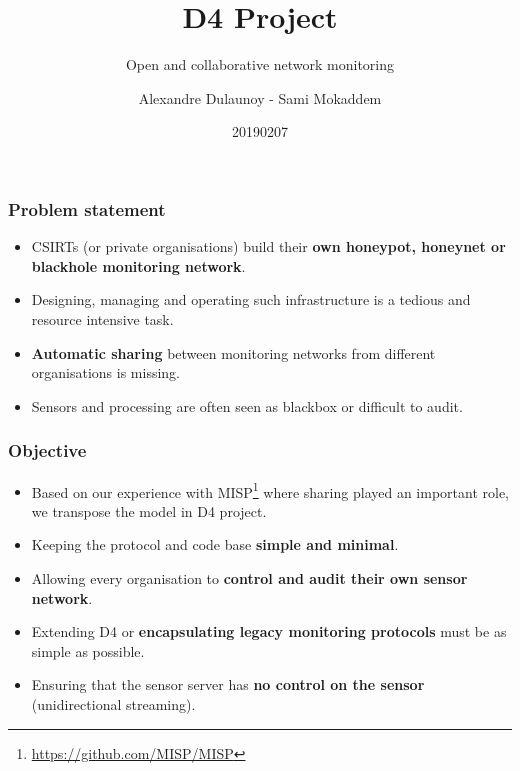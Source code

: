 \documentclass{beamer}
\title{D4 Project}
\subtitle{Open and collaborative network monitoring}
\author{Alexandre Dulaunoy - Sami Mokaddem}
\institute{Team CIRCL \\ \url{https://www.d4-project.org/}}
\date{20190207}
\begin{document}
    \begin{frame}
        \maketitle
    \end{frame}


\begin{frame}
        \frametitle{Problem statement}
        \begin{itemize}
                \item CSIRTs (or private organisations) build their {\bf own honeypot, honeynet or blackhole monitoring network}.
                \item Designing, managing and operating such infrastructure is a tedious and resource intensive task.
                \item {\bf Automatic sharing} between monitoring networks from different organisations is missing.
                \item Sensors and processing are often seen as blackbox or difficult to audit.

        \end{itemize}
\end{frame}


\begin{frame}
 \frametitle{Objective}
 \begin{itemize}
         \item Based on our experience with MISP\footnote{\url{https://github.com/MISP/MISP}} where sharing played an important role, we transpose
                 the model in D4 project.
         \item Keeping the protocol and code base {\bf simple and minimal}.
         \item Allowing every organisation to {\bf control and audit their own sensor network}.
         \item Extending D4 or {\bf encapsulating legacy monitoring protocols} must be as simple as possible.
         \item Ensuring that the sensor server has {\bf no control on the sensor} (unidirectional streaming).
 \end{itemize}
\end{frame}
\end{document}
